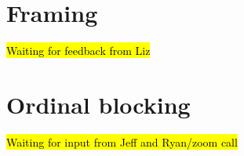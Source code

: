 \section*{Framing}
	\begin{coi}
		\item \hl{Waiting for feedback from Liz}
	\end{coi} 

\section*{Ordinal blocking}
	\begin{coi}
		\item \hl{Waiting for input from Jeff and Ryan/zoom call}
	\end{coi}
	

	




